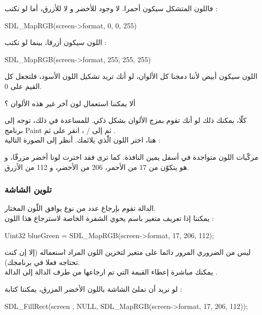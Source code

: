فاللون المتشكل سيكون أحمرا. لا وجود للأخضر و لا للأزرق، أما لو نكتب :
\begin{Csource}
SDL_MapRGB(screen->format, 0, 0, 255)
\end{Csource}
اللون سيكون أزرقا، بينما لو نكتب :
\begin{Csource}
SDL_MapRGB(screen->format, 255, 255, 255)
\end{Csource}

اللون سيكون أبيض لأننا دمجنا كل الألوان، لو أنك تريد تشكيل اللون الأسود، فلتجعل كل القيم على 0.

\begin{question}
ألا يمكننا استعمال لون آخر غير هذه الألوان ؟
\end{question}

كلّا، يمكنك ذلك لو أنك تقوم بمزج الألوان بشكل ذكي. للمساعدة في ذلك، توجه إلى برنامج
\textenglish{Paint}
ثم إلى
 / ،
انقر على
ثم
.\\
هنا، اختر اللون الّذي يلائمك. أنظر إلى الصورة التالية :


مركّبات اللون متواجدة في أسفل يمين النافذة. كما ترى فقد اخترت لونا أخضر مزرقّا، و هو يتكوّن من 17 من الأحمر، 206 من الأخضر، و 112 من الأزرق.
\subsubsection{تلوين الشاشة}

الدالة
تقوم بإرجاع عدد من نوع
يوافق اللّون المختار.\\
يمكننا إذا تعريف متغير باسم
يحوي الشفرة الخاصة لاسترجاع هذا اللون :

\begin{Csource}
Uint32 blueGreen = SDL_MapRGB(screen->format, 17, 206, 112);
\end{Csource}

ليس من الضروري المرور دائما على متغير لتخزين اللون المراد استعماله (إلا إن كنت تحتاجه فعلا في برنامجك).\\
يمكنك مباشرة إعطاء القيمة التي تم ارجاعها من طرف الدالة
إلى الدالة
.

لو نريد أن نملئ الشاشة باللون الأخضر المزرق، يمكننا كتابة :

\begin{Csource}
SDL_FillRect(screen , NULL, SDL_MapRGB(screen->format, 17, 206, 112));
\end{Csource}

